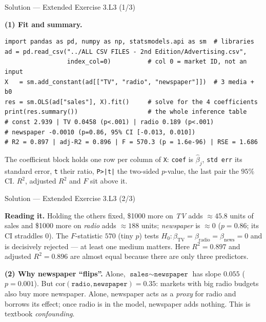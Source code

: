 \documentclass[aspectratio=169,11pt]{beamer}
\begin{document}
\begin{frame}[fragile]{Solution --- Extended Exercise 3.L3 (1/3)}
  \begin{solutionbox}
    \textbf{(1) Fit and summary.}
\begin{lstlisting}
import pandas as pd, numpy as np, statsmodels.api as sm  # libraries
ad = pd.read_csv("../ALL CSV FILES - 2nd Edition/Advertising.csv",
                 index_col=0)          # col 0 = market ID, not an input
X   = sm.add_constant(ad[["TV", "radio", "newspaper"]])  # 3 media + b0
res = sm.OLS(ad["sales"], X).fit()     # solve for the 4 coefficients
print(res.summary())                   # the whole inference table
# const 2.939 | TV 0.0458 (p<.001) | radio 0.189 (p<.001)
# newspaper -0.0010 (p=0.86, 95% CI [-0.013, 0.010])
# R2 = 0.897 | adj-R2 = 0.896 | F = 570.3 (p = 1.6e-96) | RSE = 1.686
\end{lstlisting}
  \end{solutionbox}
  \begin{readme}\footnotesize
    The coefficient block holds one row per column of \texttt{X}:
    \texttt{coef} is $\hat\beta_j$, \texttt{std err} its standard error,
    \texttt{t} their ratio, \texttt{P>|t|} the two-sided $p$-value, the
    last pair the $95\%$ CI. $R^2$, adjusted $R^2$ and $F$ sit above it.
  \end{readme}
\end{frame}

\begin{frame}{Solution --- Extended Exercise 3.L3 (2/3)}
  \begin{solutionbox}
    \textbf{Reading it.} Holding the others fixed, \$1000 more on
    \emph{TV} adds $\approx 45.8$ units of sales and \$1000 more on
    \emph{radio} adds $\approx 188$ units; \emph{newspaper} is $\approx 0$
    ($p=0.86$; its CI straddles $0$). The $F$-statistic $570$ (tiny $p$)
    tests $H_0:\beta_{\text{TV}}=\beta_{\text{radio}}=\beta_{\text{news}}=0$
    and is decisively rejected --- at least one medium matters. Here
    $R^2=0.897$ and adjusted $R^2=0.896$ are almost equal because there
    are only three predictors.

    \textbf{(2) Why newspaper ``flips''.} Alone,
    $\texttt{sales}\sim\texttt{newspaper}$ has slope $0.055$ ($p=0.001$).
    But $\mathrm{cor}(\texttt{radio},\texttt{newspaper})=0.35$: markets
    with big radio budgets also buy more newspaper. Alone, newspaper acts
    as a \emph{proxy} for radio and borrows its effect; once radio is in
    the model, newspaper adds nothing. This is textbook \emph{confounding}.
  \end{solutionbox}
\end{frame}
\end{document}
